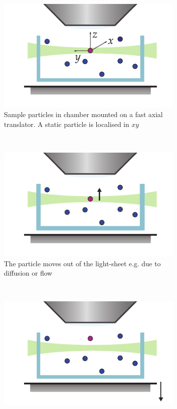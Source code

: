 \begin{figure}
	\centering
	\begin{subfigure}[t]{0.4\linewidth}
		\centering
		\includegraphics{Chapters/spt/Figs/PDF/tracking/1_piezo_track}
		\caption{Sample particles in chamber mounted on a fast axial translator. A static particle is localised in \(xy\)}
		\label{fig:SPIMSPT1}
	\end{subfigure}~~
	\begin{subfigure}[t]{0.4\linewidth}
		\centering
		\includegraphics{Chapters/spt/Figs/PDF/tracking/2_piezo_track}
		\caption{The particle moves out of the light-sheet e.g. due to diffusion or flow}
		\label{fig:SPIMSPT2}
	\end{subfigure}
    \\\vspace{\abovecaptionskip}
	\begin{subfigure}[t]{0.4\linewidth}
		\centering
		\includegraphics{Chapters/spt/Figs/PDF/tracking/3_piezo_track}

\end{subfigure}
\end{figure}

